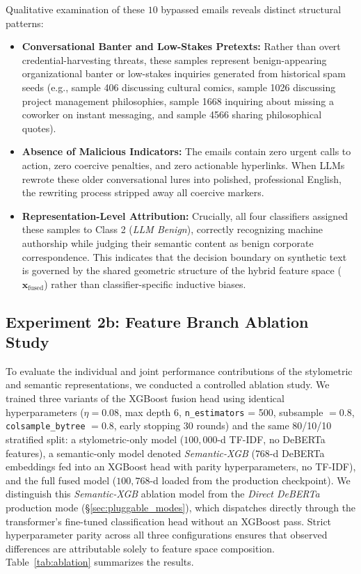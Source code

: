 \documentclass[journal]{IEEEtran}
\begin{document}
Qualitative examination of these $10$ bypassed emails reveals distinct structural patterns:
\begin{itemize}
    \item \textbf{Conversational Banter and Low-Stakes Pretexts:} Rather than overt credential-harvesting threats, these samples represent benign-appearing organizational banter or low-stakes inquiries generated from historical spam seeds (e.g., sample 406 discussing cultural comics, sample 1026 discussing project management philosophies, sample 1668 inquiring about missing a coworker on instant messaging, and sample 4566 sharing philosophical quotes).
    \item \textbf{Absence of Malicious Indicators:} The emails contain zero urgent calls to action, zero coercive penalties, and zero actionable hyperlinks. When LLMs rewrote these older conversational lures into polished, professional English, the rewriting process stripped away all coercive markers.
    \item \textbf{Representation-Level Attribution:} Crucially, all four classifiers assigned these samples to Class 2 (\emph{LLM Benign}), correctly recognizing machine authorship while judging their semantic content as benign corporate correspondence. This indicates that the decision boundary on synthetic text is governed by the shared geometric structure of the hybrid feature space ($\mathbf{x}_{\text{fused}}$) rather than classifier-specific inductive biases.
\end{itemize}

\subsection{Experiment 2b: Feature Branch Ablation Study}
\label{sec:ablation}
To evaluate the individual and joint performance contributions of the stylometric and semantic representations, we conducted a controlled ablation study. We trained three variants of the XGBoost fusion head using identical hyperparameters ($\eta=0.08$, max depth 6, \texttt{n\_estimators} = 500, subsample $= 0.8$, \texttt{colsample\_bytree} $= 0.8$, early stopping 30 rounds) and the same 80/10/10 stratified split: a stylometric-only model ($100,000$-d TF-IDF, no DeBERTa features), a semantic-only model denoted \emph{Semantic-XGB} ($768$-d DeBERTa embeddings fed into an XGBoost head with parity hyperparameters, no TF-IDF), and the full fused model ($100,768$-d loaded from the production checkpoint). We distinguish this \emph{Semantic-XGB} ablation model from the \emph{Direct DeBERTa} production mode (\S\ref{sec:pluggable_modes}), which dispatches directly through the transformer's fine-tuned classification head without an XGBoost pass. Strict hyperparameter parity across all three configurations ensures that observed differences are attributable solely to feature space composition. Table~\ref{tab:ablation} summarizes the results.
\end{document}
